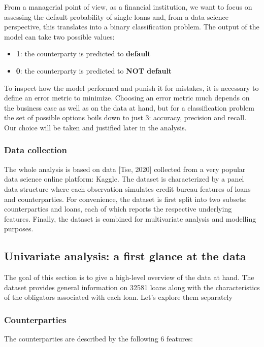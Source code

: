 \documentclass[a4paper,12pt]{article}
\begin{document}
    From a managerial point of view, as a financial institution, we want to focus on assessing the default probability of 
    single loans and, from a data science perspective, this translates into a binary classification problem. 
    The output of the model can take two possible values:
    
    \begin{itemize}
        \item \textbf{1}: the counterparty is predicted to \textbf{default} 
        \item \textbf{0}: the counterparty is predicted to \textbf{NOT default} 
    \end{itemize} 

    To inspect how the model performed and punish it for mistakes, it is necessary to define an error metric to minimize. 
    Choosing an error metric much depends on the business case as well as on the data at hand, but for a classification problem 
    the set of possible options boils down to just 3: accuracy, precision and recall. Our choice will be taken and justified later in the analysis.

    \subsubsection*{Data collection}
    The whole analysis is based on data [Tse, 2020] collected from a very popular data science online platform: Kaggle. 
    The dataset is characterized by a panel data structure where each observation simulates credit bureau features of loans and counterparties. 
    For convenience,  the dataset is first split into two subsets: counterparties and loans, each of which reports the respective underlying features. 
    Finally, the dataset is combined for multivariate analysis and modelling purposes.

    \subsection{Univariate analysis: a first glance at the data}
    The goal of this section is to give a high-level overview of the data 
    at hand. The dataset provides general information on 32581 loans along with
    the characteristics of the obligators associated with each loan.
    Let's explore them separately

    \subsubsection*{Counterparties}
    The counterparties are described by the following 6 features:
\end{document}
